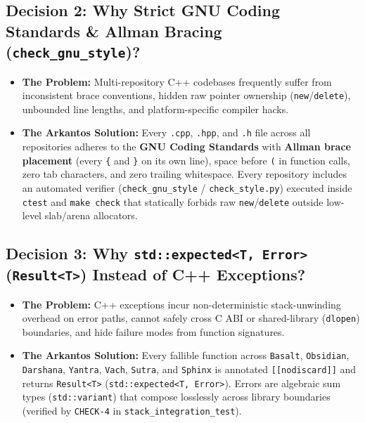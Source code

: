 \documentclass[11pt,a4paper]{article}
\begin{document}
\subsection{Decision 2: Why Strict GNU Coding Standards \& Allman Bracing (\texttt{check\_gnu\_style})?}
\begin{itemize}[leftmargin=1.5em]
  \item \textbf{The Problem:} Multi-repository C++ codebases frequently suffer from inconsistent brace conventions, hidden raw pointer ownership (\texttt{new}/\texttt{delete}), unbounded line lengths, and platform-specific compiler hacks.
  \item \textbf{The Arkantos Solution:} Every \texttt{.cpp}, \texttt{.hpp}, and \texttt{.h} file across all repositories adheres to the \textbf{GNU Coding Standards} with \textbf{Allman brace placement} (every \texttt{\{} and \texttt{\}} on its own line), space before \texttt{(} in function calls, zero tab characters, and zero trailing whitespace. Every repository includes an automated verifier (\texttt{check\_gnu\_style} / \texttt{check\_style.py}) executed inside \texttt{ctest} and \texttt{make check} that statically forbids raw \texttt{new}/\texttt{delete} outside low-level slab/arena allocators.
\end{itemize}

\subsection{Decision 3: Why \texttt{std::expected<T, Error>} (\texttt{Result<T>}) Instead of C++ Exceptions?}
\begin{itemize}[leftmargin=1.5em]
  \item \textbf{The Problem:} C++ exceptions incur non-deterministic stack-unwinding overhead on error paths, cannot safely cross C ABI or shared-library (\texttt{dlopen}) boundaries, and hide failure modes from function signatures.
  \item \textbf{The Arkantos Solution:} Every fallible function across \texttt{Basalt}, \texttt{Obsidian}, \texttt{Darshana}, \texttt{Yantra}, \texttt{Vach}, \texttt{Sutra}, and \texttt{Sphinx} is annotated \texttt{[[nodiscard]]} and returns \texttt{Result<T>} (\texttt{std::expected<T, Error>}). Errors are algebraic sum types (\texttt{std::variant}) that compose losslessly across library boundaries (verified by \texttt{CHECK-4} in \texttt{stack\_integration\_test}).
\end{itemize}
\end{document}
